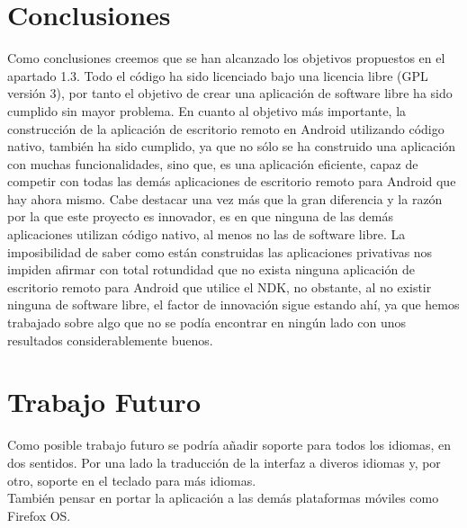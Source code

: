 \section{Conclusiones}
Como conclusiones creemos que se han alcanzado los objetivos propuestos en el apartado 1.3. Todo el código ha sido licenciado bajo una licencia libre (GPL versión 3), por tanto el objetivo de crear una aplicación de software libre ha sido cumplido sin mayor problema. En cuanto al objetivo más importante, la construcción de la aplicación de escritorio remoto en Android utilizando código nativo, también ha sido cumplido, ya que no sólo se ha construido una aplicación con muchas funcionalidades, sino que, es una aplicación eficiente, capaz de competir con todas las demás aplicaciones de escritorio remoto para Android que hay ahora mismo. Cabe destacar una vez más que la gran diferencia y la razón por la que este proyecto es innovador, es en que ninguna de las demás aplicaciones utilizan código nativo, al menos no las de software libre. La imposibilidad de saber como están construidas las aplicaciones privativas nos impiden afirmar con total rotundidad que no exista ninguna aplicación de escritorio remoto para Android que utilice el NDK, no obstante, al no existir ninguna de software libre, el factor de innovación sigue estando ahí, ya que hemos trabajado sobre algo que no se podía encontrar en ningún lado con unos resultados considerablemente buenos.

\section{Trabajo Futuro}

Como posible trabajo futuro se podría añadir soporte para todos los idiomas, en dos sentidos. Por una lado la traducción de la interfaz a diveros idiomas y, por otro, soporte en el teclado para más idiomas.\\

También pensar en portar la aplicación a las demás plataformas móviles como Firefox OS. 

